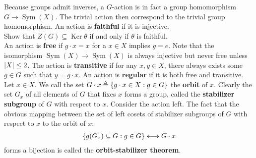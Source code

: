 \documentclass{report}
\begin{document}
Because groups admit inverses, a $G$-action is in fact a group homomorphism $G \rightarrow \operatorname{Sym}(X)$. The trivial action then correspond to the trivial group homomorphism.  An action is \textbf{faithful} if it is injective. \\


Show that $Z(G)\subseteq \operatorname{Ker} \theta$ if and only if $\theta$ is faithful.  \\


An action is \textbf{free} if $g\cdot x=x$ for a $x\in X$ implies $g=e$. Note that the isomorphism $\operatorname{Sym}(X)\rightarrow \operatorname{Sym}(X)$ is always injective but never free unless $\left|X\right|\leq 2$. The action is \textbf{transitive} if for any $x,y \in X$, there always exists some $g \in G$ such that $y= g \cdot x$. An action is \textbf{regular} if it is both free and transitive.\\

Let $x \in X$. We call the set $G\cdot x\triangleq \left\{ g\cdot x \in X: g\in G  \right\}$ the \textbf{orbit} of $x$. Clearly the set $G_x$ of all elements of $G$ that fixes $x$ forms a group, called the \textbf{stabilizer subgroup} of $G$ with respect to $x$. Consider the action left. The fact that the obvious mapping between the set of left cosets of stabilizer subgroups of $G$ with respect to $x$ to the orbit of  $x$: 
\begin{align*}
\left\{ g (G_x) \subseteq G : g \in G \right\} \longleftrightarrow G \cdot x
\end{align*}
forms a bijection is called the \textbf{orbit-stabilizer theorem}. \\
\end{document}
